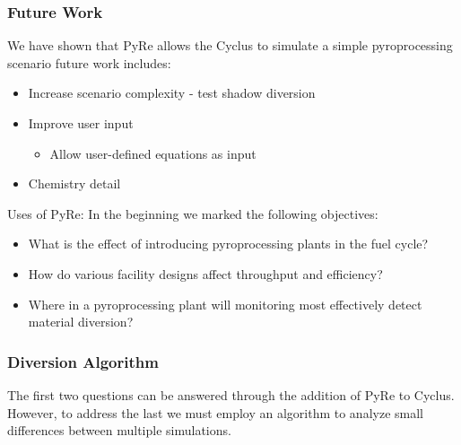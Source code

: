 \begin{frame}
  \frametitle{Future Work}
  We have shown that PyRe allows the Cyclus to simulate a simple pyroprocessing scenario future work includes:
  \begin{itemize}
     \item Increase scenario complexity - test shadow diversion
     \item Improve user input
     \begin{itemize}
      	\item Allow user-defined equations as input
     \end{itemize}
     \item Chemistry detail
  \end{itemize}
\begin{block}{Uses of PyRe:}
	In the beginning we marked the following objectives:
\begin{itemize}
	\item What is the effect of introducing pyroprocessing plants in the fuel cycle?
	\item How do various facility designs affect throughput and efficiency?
	\item Where in a pyroprocessing plant will monitoring most 
	effectively detect material diversion?
\end{itemize}
\end{block}
\end{frame}

\begin{frame}
\frametitle{Diversion Algorithm}
The first two questions can be answered through the addition of PyRe to Cyclus. However, to address the last we must 
employ an algorithm to analyze small differences between multiple simulations.
\end{frame}
